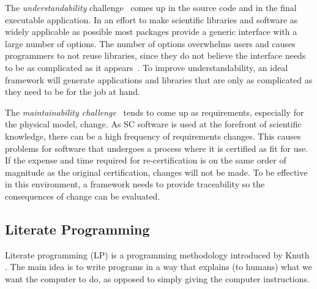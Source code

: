 \documentclass{sig-alternate-05-2015}
\begin{document}
The \textit{understandability} challenge~\cite{Yu2011} comes up in the source
code and in the final executable application.  In an effort to make scientific
libraries and software as widely applicable as possible most packages provide a
generic interface with a large number of options.  The number of options
overwhelms users and causes programmers to not reuse libraries, since they do
not believe the interface needs to be as complicated as it
appears~\cite{Dubois2002}.  To improve understandability, an ideal framework
will generate applications and libraries that are only as complicated as they
need to be for the job at hand.


The \textit{maintainability challenge}~\cite{Yu2011} tends to come up
as requirements, especially for the physical model,
change. As SC software is used at the forefront of scientific knowledge, there
can be a high frequency of requirements changes.  This causes problems for
software that undergoes a process where it is certified as fit for use.  If the
expense and time required for re-certification is on the same order of magnitude
as the original certification, changes will not be made.  To be effective in
this environment, a framework needs to provide traceability so the consequences
of change can be evaluated.

\subsection{Literate Programming} \label{ssec:literate}

Literate programming (LP) is a programming methodology introduced by Knuth
\cite{Knuth1984}. The main idea is to write programs in a way that explains (to
humans) what we want the computer to do, as opposed to simply giving the
computer instructions. %
\end{document}

